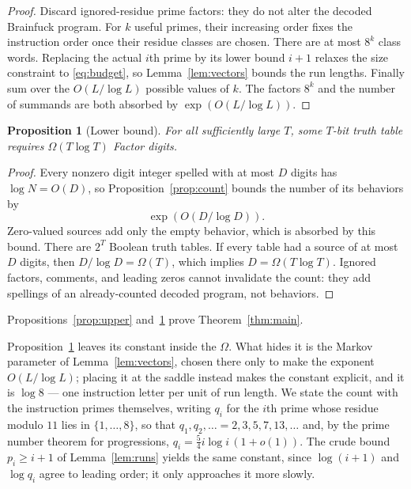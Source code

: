 \documentclass[11pt]{article}
\newtheorem{proposition}[theorem]{Proposition}
\theoremstyle{remark}
\begin{document}
\begin{proof}
Discard ignored-residue prime factors: they do not alter the decoded
Brainfuck program.  For $k$ useful primes, their increasing order fixes the
instruction order once their residue classes are chosen.  There are at most
$8^k$ class words.  Replacing the actual $i$th prime by its lower bound
$i+1$ relaxes the size constraint to \eqref{eq:budget}, so
Lemma~\ref{lem:vectors} bounds the run lengths.  Finally sum over the
$O(L/\log L)$ possible values of $k$.  The factors $8^k$ and the number of
summands are both absorbed by $\exp(O(L/\log L))$.
\end{proof}

\begin{proposition}[Lower bound]\label{prop:lower}
For all sufficiently large $T$, some $T$-bit truth table requires
$\Omega(T\log T)$ Factor digits.
\end{proposition}

\begin{proof}
Every nonzero digit integer spelled with at most $D$ digits has
$\log N=O(D)$, so Proposition~\ref{prop:count} bounds the number of its
behaviors by
\[
  \exp(O(D/\log D)).
\]
Zero-valued sources add only the empty behavior, which is absorbed by this
bound.
There are $2^T$ Boolean truth tables.  If every table had a source of at most $D$ digits,
then $D/\log D=\Omega(T)$, which implies $D=\Omega(T\log T)$.
Ignored factors, comments, and leading zeros cannot invalidate the count:
they add spellings of an already-counted decoded program, not behaviors.
\end{proof}

Propositions~\ref{prop:upper} and~\ref{prop:lower} prove
Theorem~\ref{thm:main}.

Proposition~\ref{prop:lower} leaves its constant inside the $\Omega$.  What
hides it is the Markov parameter of Lemma~\ref{lem:vectors}, chosen there
only to make the exponent $O(L/\log L)$; placing it at the saddle instead
makes the constant explicit, and it is $\log8$ --- one instruction letter per
unit of run length.  We state the count with the instruction primes
themselves, writing $q_i$ for the $i$th prime whose residue modulo $11$ lies
in $\{1,\ldots,8\}$, so that $q_1,q_2,\ldots=2,3,5,7,13,\ldots$ and, by the
prime number theorem for progressions, $q_i=\frac54 i\log i\,(1+o(1))$.  The
crude bound $p_i\ge i+1$ of Lemma~\ref{lem:runs} yields the same constant,
since $\log(i+1)$ and $\log q_i$ agree to leading order; it only approaches
it more slowly.
\end{document}
